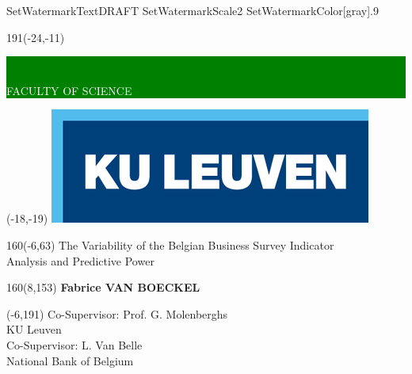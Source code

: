 \documentclass[12pt,a4paper,oneside]{book}
\begin{document}
SetWatermarkText{DRAFT}
SetWatermarkScale{2}
SetWatermarkColor[gray]{.9}

\thispagestyle{empty}
\newcommand{\form}[1]{\scalebox{1.087}{\boldmath{#1}}}
\sffamily
%
\begin{textblock}{191}(-24,-11)
\colorbox{green}{\hspace{139mm}\ \parbox[c][18truemm]{52mm}{\textcolor{white}{FACULTY OF SCIENCE}}}
\end{textblock}
%
\begin{textblock}{70}(-18,-19)
\textblockcolour{}
\includegraphics*[height=19.8truemm]{Images/LogoKULeuven.png}
\end{textblock}
%
\begin{textblock}{160}(-6,63)
\textblockcolour{}
\vspace{-\parskip}
\flushleft
\fontsize{40}{42}\selectfont \textcolor{bluetitle}{The Variability of the Belgian Business Survey Indicator}\\[1.5mm]
\fontsize{20}{22}\selectfont Analysis and Predictive Power
\end{textblock}
%
\begin{textblock}{160}(8,153)
\textblockcolour{}
\vspace{-\parskip}
\flushright
\fontsize{14}{16}\selectfont \textbf{Fabrice VAN BOECKEL}
\end{textblock}
%
\begin{textblock}{70}(-6,191)
\textblockcolour{}
\vspace{-\parskip}
\flushleft
Co-Supervisor: Prof. G. Molenberghs\\[-2pt]
\textcolor{blueaff}{KU Leuven}\\[5pt]
Co-Supervisor: L. Van Belle\\[-2pt]
\textcolor{blueaff}{National Bank of Belgium}\\[5pt]
\end{textblock}
\end{document}
